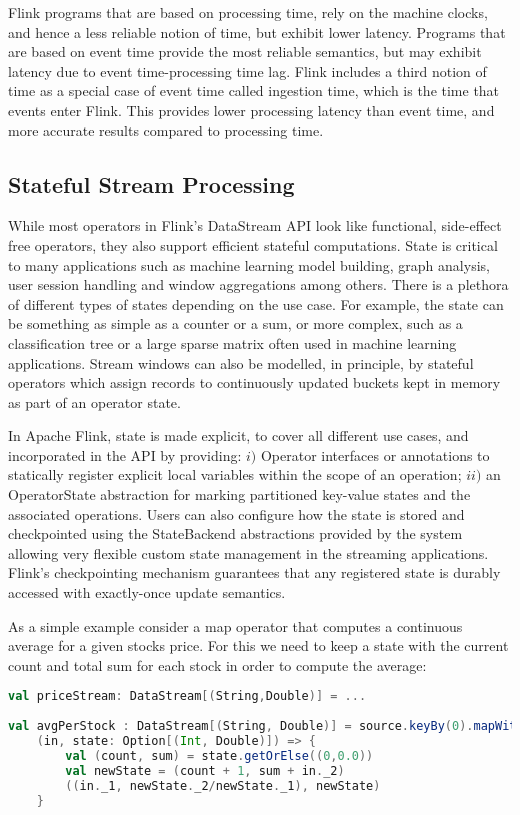 Flink programs that are based on processing time, rely on the machine clocks, and hence a less reliable notion of time, but exhibit lower latency. Programs that are based on event time provide the most reliable semantics, but may exhibit latency due to event time-processing time lag. Flink includes a third notion of time as a special case of event time called ingestion time, which is the time that events enter Flink. This provides  lower processing latency than event time, and more accurate results compared to processing time.


\subsection{Stateful Stream Processing}
While most operators in Flink’s DataStream API look like functional, side-effect free operators, they also support efficient stateful computations. State is critical to many applications such as machine learning model building, graph analysis, user session handling and window aggregations among others. There is a plethora of different types of states depending on the use case. For example, the state can be something as simple as a counter or a sum, or more complex, such as a classification tree or a large sparse matrix often used in machine learning applications. Stream windows can also be modelled, in principle, by stateful operators which assign records to continuously updated buckets kept in memory as part of an operator state. 

In Apache Flink, state is made explicit, to cover all different use cases, and incorporated in the API by providing: $i)$ Operator interfaces or annotations to statically register explicit local variables within the scope of an operation;  $ii)$ an OperatorState abstraction for marking partitioned key-value states and the associated operations. Users can also configure how the state is stored and checkpointed using the StateBackend abstractions provided by the system allowing very flexible custom state management in the streaming applications. Flink’s checkpointing mechanism guarantees that any registered state is durably accessed with exactly-once update semantics. 

As a simple example consider a map operator that computes a continuous average for a given stocks price. For this we need to keep a state with the current count and total sum for each stock in order to compute the average:


\begin{lstlisting}[language=Scala]
val priceStream: DataStream[(String,Double)] = ...
 
val avgPerStock : DataStream[(String, Double)] = source.keyBy(0).mapWithState(
    (in, state: Option[(Int, Double)]) => {
		val (count, sum) = state.getOrElse((0,0.0))
		val newState = (count + 1, sum + in._2)
		((in._1, newState._2/newState._1), newState)
	}
\end{lstlisting}

